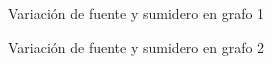 \documentclass{article}
\begin{document}
\begin{figure}[htbp]
\caption{Variación de fuente y sumidero en grafo 1}
\label{Fig12} 
\end{figure}

\begin{figure}[htbp]
\caption{Variación de fuente y sumidero en grafo 2}
\label{Fig13} 
\end{figure}
\end{document}
